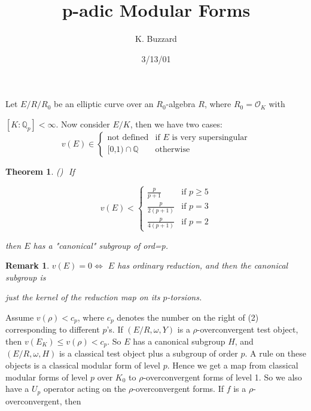 \documentclass{article}%
\author{K. Buzzard}
\title{p-adic Modular Forms}
\date{3/13/01}
\newtheorem{rmk}{Remark}
\newtheorem{thm}{Theorem}
\newcommand{\BQ}{{\mathbb{Q}}}
\begin{document}
\maketitle

Let $E/R/R_0$ be an elliptic curve over an $R_0$-algebra $R$, where
$R_0=\mathcal{O}_K$ with

$[K:\BQ_p]<\infty$. Now consider $E/K$, then we have two cases:
\begin{equation}
v(E)\in
\begin{cases}\text{not defined} & \text{if $E$ is very supersingular}\\
\text{[0,1)}\cap\BQ & \text{otherwise}
\end{cases}
\end{equation}

\begin{thm}()\,\, If 

\begin{equation}
v(E)<
\begin{cases}\frac{p}{p+1} & \text{if $p\geq5$}\\
\frac{p}{2(p+1)} & \text{if $p=3$}\\
\frac{p}{4(p+1)} & \text{if $p=2$}
\end{cases}
\end{equation}

then $E$ has a "canonical" subgroup of ord=p.

\end{thm}



\begin{rmk}

$v(E)=0\Leftrightarrow$ $E$ has ordinary reduction, and then the canonical
subgroup is

just the kernel of the reduction map on its $p$-torsions.

\end{rmk}



Assume $v(\rho)<c_p$, where $c_p$ denotes the number on the right of (2)
corresponding to
different $p$'s. If $(E/R,\omega,Y)$ is a $\rho$-overconvergent test object,
then $v(E_K)\leq v(\rho)<c_p$.
So $E$ has a canonical subgroup $H$, and $(E/R,\omega,H)$ is a classical
test object 
plus a subgroup of order $p$. A rule on these objects is a classical
modular form of level $p$. Hence we get a map from classical modular forms
of level $p$
over $K_0$ to $\rho$-overconvergent forms of level 1.
So we also have a $U_p$ operator acting on the $\rho$-overconvergent forms.
If $f$ is a
$\rho$-overconvergent, then
\end{document}
